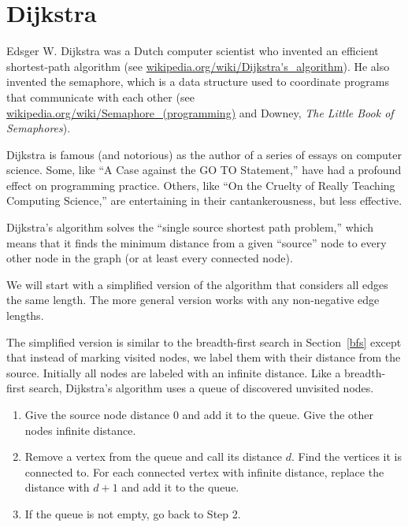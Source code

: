 \documentclass[10pt]{book}
\begin{document}
\section{Dijkstra}

Edsger W. Dijkstra was a Dutch computer scientist who invented an
efficient shortest-path algorithm (see
\url{wikipedia.org/wiki/Dijkstra's_algorithm}).  He also invented the
semaphore, which is a data structure used to coordinate programs that
communicate with each other (see
\url{wikipedia.org/wiki/Semaphore_(programming)} and Downey, {\em The
  Little Book of Semaphores}).

Dijkstra is famous (and notorious) as the author of a series
of essays on computer science.
Some, like ``A Case against the GO TO Statement,'' have
had a profound effect on programming practice.
Others, like
``On the Cruelty of Really Teaching Computing Science,'' are
entertaining in their cantankerousness, but less effective.

Dijkstra's algorithm solves the ``single source shortest path problem,''
which means that it finds the minimum distance from a given ``source''
node to every other node in the graph (or at least every connected
node).

We will start with a simplified version of the algorithm that
considers all edges the same length.  The more general version
works with any non-negative edge lengths.

The simplified version is similar to the breadth-first search
in Section~\ref{bfs} except that instead of marking visited nodes,
we label them with their distance from the source.  Initially
all nodes are labeled with an infinite distance.  Like a
breadth-first search, Dijkstra's algorithm uses a queue of
discovered unvisited nodes.

\begin{enumerate}

\item Give the source node distance 0 and add it to the queue.
Give the other nodes infinite distance.

\item Remove a vertex from the queue and call its distance $d$.  Find
  the vertices it is connected to.  For each connected vertex
  with infinite distance, replace the distance with $d+1$ and
  add it to the queue.

\item If the queue is not empty, go back to Step 2.

\end{enumerate}
\end{document}
